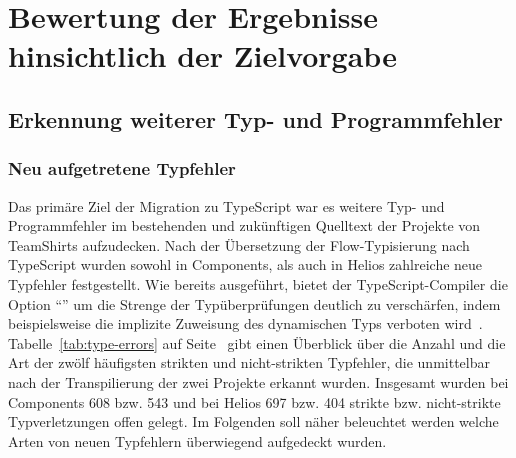 \section{Bewertung der Ergebnisse hinsichtlich der Zielvorgabe}

\subsection{Erkennung weiterer Typ- und Programmfehler}
\label{goal:new-type-errors}

\subsubsection{Neu aufgetretene Typfehler}

Das primäre Ziel der Migration zu TypeScript war es weitere Typ- und Programmfehler im bestehenden und zukünftigen Quelltext der Projekte von TeamShirts aufzudecken. Nach der Übersetzung der Flow-Typisierung nach TypeScript wurden sowohl in Components, als auch in Helios zahlreiche neue Typfehler festgestellt. Wie bereits ausgeführt, bietet der TypeScript-Compiler die Option \enquote{} um die Strenge der Typüberprüfungen deutlich zu verschärfen, indem beispielsweise die implizite Zuweisung des dynamischen Typs  verboten wird~\autocite{TSC:OPTIONS}. Tabelle~\ref{tab:type-errors} auf Seite~\pageref{tab:type-errors} gibt einen Überblick über die Anzahl und die Art der zwölf häufigsten strikten und nicht-strikten Typfehler, die unmittelbar nach der Transpilierung der zwei Projekte erkannt wurden. Insgesamt wurden bei Components 608 bzw. 543 und bei Helios 697 bzw. 404 strikte bzw. nicht-strikte Typverletzungen offen gelegt. Im Folgenden soll näher beleuchtet werden welche Arten von neuen Typfehlern überwiegend aufgedeckt wurden.

\medbreak


